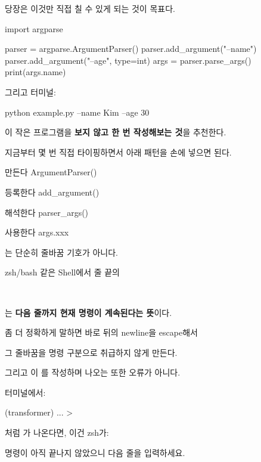 당장은 이것만 직접 칠 수 있게 되는 것이 목표다.

\begin{dhkcode}
import argparse

parser = argparse.ArgumentParser()
parser.add_argument("--name")
parser.add_argument("--age", type=int)
args = parser.parse_args()
print(args.name)
\end{dhkcode}

그리고 터미널:

\begin{dhkzsh}
python example.py --name Kim --age 30
\end{dhkzsh}

이 작은 프로그램을 \textbf{보지 않고 한 번 작성해보는 것}을 추천한다.

지금부터 몇 번 직접 타이핑하면서 아래 패턴을 손에 넣으면 된다.

\begin{dhksmry}[centered]
만든다
ArgumentParser()

\da

등록한다
add_argument()

\da

해석한다
parser_args()

\da

사용한다
args.xxx
\end{dhksmry}

\begin{dhksmry}[centered]
\zsh{ \ } 는 단순히 줄바꿈 기호가 아니다.
\end{dhksmry}

zsh/bash 같은 Shell에서 줄 끝의 

\begin{dhkcode}
    \
\end{dhkcode}

는 \textbf{다음 줄까지 현재 명령이 계속된다는 뜻}이다.

좀 더 정확하게 말하면 바로 뒤의 newline을 escape해서

그 줄바꿈을 명령 구분으로 취급하지 않게 만든다.

그리고 이 \zsh{ \ }를 작성하며 나오는 \zsh{ > } 또한 오류가 아니다.

터미널에서:

\begin{dhkzsh}
(transformer) ... %
>
\end{dhkzsh}

처럼 \zsh{ > }가 나온다면, 이건 zsh가:

\begin{dhksmry}[centered]
명령이 아직 끝나지 않았으니 다음 줄을 입력하세요.
\end{dhksmry}


